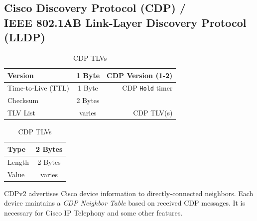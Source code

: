 \documentclass[12pt]{article}
\begin{document}
	\subsection[Cisco CDP / IEEE 802.1AB LLDP]{Cisco Discovery Protocol (CDP) /\\IEEE 802.1AB Link-Layer Discovery Protocol (LLDP) \label{subsec:CDP/802.1AB}}
	\begin{table}[H]
	\begin{minipage}{.6\linewidth}
	\centering
	\caption{CDP Header Format \label{tab:CDP}}
	\begin{tabular}{| l | c | r |}
	\hline
	Version			& 1 Byte	& CDP Version (1-2)\\\hline
	Time-to-Live (TTL)	& 1 Byte	& CDP \texttt{Hold} timer\\\hline
	Checksum			& 2 Bytes	&\\\hline
	TLV List 			& varies	& CDP TLV(s)\\\hline
	\end{tabular}\end{minipage}\hfill
	\begin{minipage}{.3\linewidth}
	\centering
	\caption{CDP TLVs \label{tab:CDP TLV}}
	\begin{tabular}{| l | c |}
	\hline
	Type		& 2 Bytes\\\hline
	Length	& 2 Bytes\\\hline
	Value		& varies\\\hline
	\end{tabular}\end{minipage}\end{table}
	CDPv2 advertises Cisco device information to directly-connected neighbors. Each device maintains a \textit{CDP Neighbor Table} based on received CDP messages. It is necessary for Cisco IP Telephony and some other features.
\end{document}
